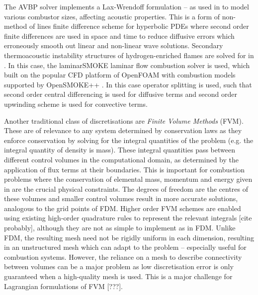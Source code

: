 The AVBP solver \cite{cerfacsAVBP, schonfeld1999SteadyUnsteadyFlow} implements a Lax-Wrendoff formulation \cite{lax1960SystemsConservationLaws} -- as used in \cite{garby2013LargeEddySimulationCombustion} to model various combustor sizes, affecting acoustic properties. This is a form of non-method of lines finite difference scheme for hyperbolic PDEs where second order finite differences are used in space and time to reduce diffusive errors which erroneously smooth out linear and non-linear wave solutions. Secondary thermoacoustic instability structures of hydrogen-enriched flames are solved for in \cite{jun2023ParametricInstabilityPropagating}. In this case, the laminarSMOKE \cite{cuoci2013LaminarSMOKE, cuoci2013NumericalModelingLaminar} laminar flow combustion solver is used, which built on the popular CFD platform of OpenFOAM \cite{opencfdltd2004OpenFOAM, jasak2007OpenFOAMLibraryComplex, jasak2009OpenFOAMOpenSource} with combustion models supported by OpenSMOKE++ \cite{cuoci2015OpenSMOKE, cuoci2015OpenSMOKEObjectorientedFramework}. In this case operator splitting is used, such that second order central differencing is used for diffusive terms and second order upwinding scheme is used for convective terms.

Another traditional class of discretisations are \emph{Finite Volume Methods} (FVM). These are of relevance to any system determined by conservation laws as they enforce conservation by solving for the integral quantities of the problem (e.g. the integral quantity of density is mass). These integral quantities pass between different control volumes in the computational domain, as determined by the application of flux terms at their boundaries. This is important for combustion problems where the conservation of elemental mass, momentum and energy given in  are the crucial physical constraints. The degrees of freedom are the centres of these volumes and smaller control volumes result in more accurate solutions, analogous to the grid points of FDM. Higher order FVM schemes are enabled using existing high-order quadrature rules to represent the relevant integrals [cite probably], although they are not as simple to implement as in FDM. Unlike FDM, the resulting mesh need not be rigidly uniform in each dimension, resulting in an unstructured mesh which can adapt to the problem -- especially useful for combustion systems. However, the reliance on a mesh to describe connectivity between volumes can be a major problem as low discretisation error is only guaranteed when a high-quality mesh is used. This is a major challenge for Lagrangian formulations of FVM [???].

